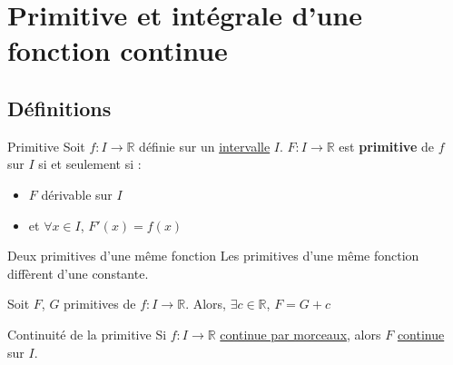 




















\section{Primitive et intégrale d'une fonction continue} %

\subsection{Définitions} %
\label{sub:Définitions}


\begin{Definition}[colbacktitle=red!75!black]{Primitive}{}
Soit $f : I \to \mathbb{R}$ définie sur un \underline{intervalle} $I$. $F : I \to \mathbb{R}$ est \textbf{primitive} de $f$ sur $I$ si et seulement si :
\begin{itemize}

    \item $F$ dérivable sur $I$ 
    \item et $\forall x \in I$, $F'(x) = f(x)$

\end{itemize}
\end{Definition}

\begin{Prop}{Deux primitives d'une même fonction}{}
  Les primitives d'une même fonction diffèrent d'une constante.

Soit $F$, $G$ primitives de $f : I \to \mathbb{R}$. Alors, $\exists c \in \mathbb{R}$, $F = G + c$
\end{Prop}

\begin{Lenma}{Continuité de la primitive}{}
Si $f : I \to \mathbb{R}$ \underline{continue par morceaux}, alors $F$ \underline{continue} sur $I$.
\end{Lenma}

